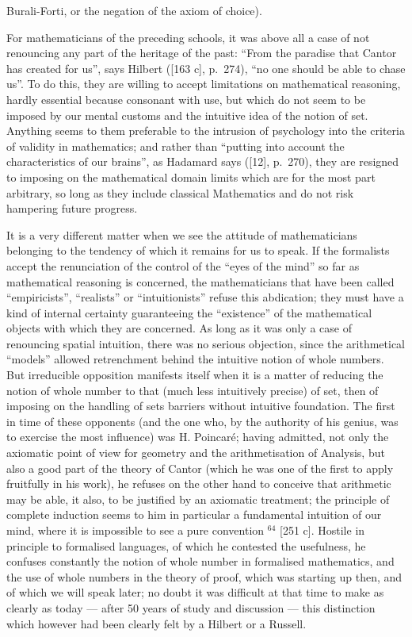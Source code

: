 Burali-Forti, or the negation of the axiom of choice).

For mathematicians of the preceding schools, it was above all a case of not renouncing any part of the heritage of the past: ``From the paradise that Cantor has created for us'', says Hilbert ({[}163 c{]}, p.~274), ``no one should be able to chase us''. To do this, they are willing to accept limitations on mathematical reasoning, hardly essential because consonant with use, but which do not seem to be imposed by our mental customs and the intuitive idea of the notion of set. Anything seems to them preferable to the intrusion of psychology into the criteria of validity in mathematics; and rather than ``putting into account the characteristics of our brains'', as Hadamard says ({[}12{]}, p.~270), they are resigned to imposing on the mathematical domain limits which are for the most part arbitrary, so long as they include classical Mathematics and do not risk hampering future progress.

It is a very different matter when we see the attitude of mathematicians belonging to the tendency of which it remains for us to speak. If the formalists accept the renunciation of the control of the ``eyes of the mind'' so far as mathematical reasoning is concerned, the mathematicians that have been called ``empiricists'', ``realists'' or ``intuitionists'' refuse this abdication; they must have a kind of internal certainty guaranteeing the ``existence'' of the mathematical objects with which they are concerned. As long as it was only a case of renouncing spatial intuition, there was no serious objection, since the arithmetical ``models'' allowed retrenchment behind the intuitive notion of whole numbers. But irreducible opposition manifests itself when it is a matter of reducing the notion of whole number to that (much less intuitively precise) of set, then of imposing on the handling of sets barriers without intuitive foundation. The first in time of these opponents (and the one who, by the authority of his genius, was to exercise the most influence) was H. Poincaré; having admitted, not only the axiomatic point of view for geometry and the arithmetisation of Analysis, but also a good part of the theory of Cantor (which he was one of the first to apply fruitfully in his work), he refuses on the other hand to conceive that arithmetic may be able, it also, to be justified by an axiomatic treatment; the principle of complete induction seems to him in particular a fundamental intuition of our mind, where it is impossible to see a pure convention \(^{64}\) {[}251 c{]}. Hostile in principle to formalised languages, of which he contested the usefulness, he confuses constantly the notion of whole number in formalised mathematics, and the use of whole numbers in the theory of proof, which was starting up then, and of which we will speak later; no doubt it was difficult at that time to make as clearly as today --- after 50 years of study and discussion --- this distinction which however had been clearly felt by a Hilbert or a Russell.


